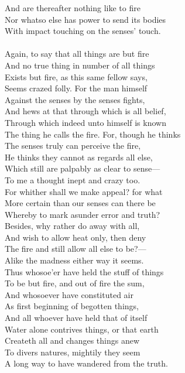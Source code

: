 And are thereafter nothing like to fire\\
Nor whatso else has power to send its bodies\\
With impact touching on the senses' touch.\\
\\
Again, to say that all things are but fire\\
And no true thing in number of all things\\
Exists but fire, as this same fellow says,\\
Seems crazed folly. For the man himself\\
Against the senses by the senses fights,\\
And hews at that through which is all belief,\\
Through which indeed unto himself is known\\
The thing he calls the fire. For, though he thinks\\
The senses truly can perceive the fire,\\
He thinks they cannot as regards all else,\\
Which still are palpably as clear to sense—\\
To me a thought inept and crazy too.\\
For whither shall we make appeal? for what\\
More certain than our senses can there be\\
Whereby to mark asunder error and truth?\\
Besides, why rather do away with all,\\
And wish to allow heat only, then deny\\
The fire and still allow all else to be?—\\
Alike the madness either way it seems.\\
Thus whosoe'er have held the stuff of things\\
To be but fire, and out of fire the sum,\\
And whosoever have constituted air\\
As first beginning of begotten things,\\
And all whoever have held that of itself\\
Water alone contrives things, or that earth\\
Createth all and changes things anew\\
To divers natures, mightily they seem\\
A long way to have wandered from the truth.\\

